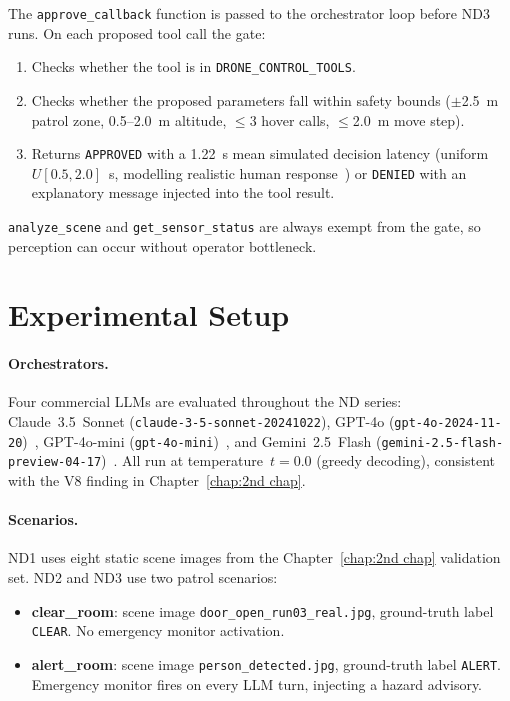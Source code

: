The \texttt{approve\_callback} function is passed to the orchestrator loop before ND3 runs.
On each proposed tool call the gate:
\begin{enumerate}
  \item Checks whether the tool is in \texttt{DRONE\_CONTROL\_TOOLS}.
  \item Checks whether the proposed parameters fall within safety bounds
    ($\pm$2.5~m patrol zone, 0.5--2.0~m altitude, $\leq$3 hover calls, $\leq$2.0~m
    move step).
  \item Returns \texttt{APPROVED} with a 1.22~s mean simulated decision latency (uniform
    $U[0.5, 2.0]$~s, modelling realistic human response~\cite{chen2018humanperformance})
    or \texttt{DENIED} with an explanatory message injected into the tool result.
\end{enumerate}
\texttt{analyze\_scene} and \texttt{get\_sensor\_status} are always exempt from the gate,
so perception can occur without operator bottleneck.

\section{Experimental Setup}
\label{sec:ch4_setup}

\paragraph{Orchestrators.}
Four commercial LLMs are evaluated throughout the ND series: Claude~3.5~Sonnet
(\texttt{claude-3-5-sonnet-20241022}), GPT-4o (\texttt{gpt-4o-2024-11-20})~\cite{achiam2023gpt4},
GPT-4o-mini (\texttt{gpt-4o-mini})~\cite{achiam2023gpt4}, and Gemini~2.5~Flash
(\texttt{gemini-2.5-flash-preview-04-17})~\cite{reid2024gemini}.
All run at temperature~$t=0.0$ (greedy decoding), consistent with the V8 finding in
Chapter~\ref{chap:2nd chap}.

\paragraph{Scenarios.}
ND1 uses eight static scene images from the Chapter~\ref{chap:2nd chap} validation set.
ND2 and ND3 use two patrol scenarios:
\begin{itemize}
  \item \textbf{clear\_room}: scene image \texttt{door\_open\_run03\_real.jpg},
    ground-truth label \texttt{CLEAR}.  No emergency monitor activation.
  \item \textbf{alert\_room}: scene image \texttt{person\_detected.jpg},
    ground-truth label \texttt{ALERT}.  Emergency monitor fires on every LLM turn,
    injecting a hazard advisory.
\end{itemize}


